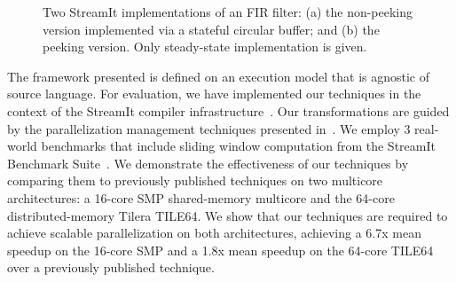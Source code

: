 \begin{figure}[t]
\caption[Two implementations of an FIR filter.]{\label{fig:fir-code}
  Two StreamIt implementations of an FIR filter:
   (a) the non-peeking version implemented via a
  stateful circular buffer; and (b) the peeking version. Only steady-state implementation is
  given.}
\vspace{-10pt}
\end{figure}

The framework presented is defined on an execution model that is
agnostic of source language.  For evaluation, we have implemented our
techniques in the context of the StreamIt compiler
infrastructure~\cite{gordon-asplos06}.  Our transformations are guided
by the parallelization management techniques presented
in~\cite{gordon-asplos06}.  We employ 3 real-world benchmarks that
include sliding window computation from the StreamIt Benchmark
Suite~\cite{streamit-suite}.  We demonstrate the effectiveness of our
techniques by comparing them to previously published techniques on two
multicore architectures: a 16-core SMP shared-memory multicore and the
64-core distributed-memory Tilera TILE64.  We show that our techniques
are required to achieve scalable parallelization on both
architectures, achieving a 6.7x mean speedup on the 16-core SMP and a
1.8x mean speedup on the 64-core TILE64 over a
previously published technique.

